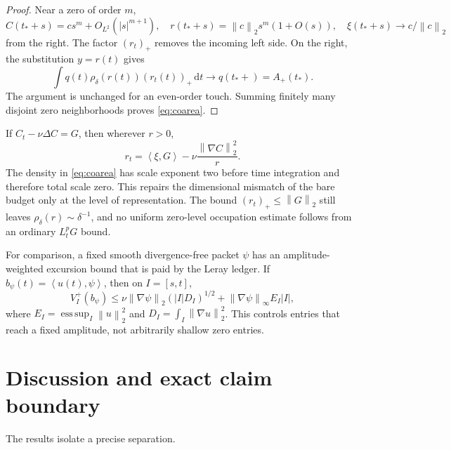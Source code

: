 \documentclass[11pt]{article}
\theoremstyle{definition}
\newcommand{\esssup}{\operatorname*{ess\,sup}}
\newcommand{\ip}[2]{\left\langle #1,#2\right\rangle}
\newcommand{\norm}[1]{\left\lVert #1\right\rVert}
\newcommand{\abs}[1]{\left\lvert #1\right\rvert}
\newcommand{\pos}[1]{\left(#1\right)_{+}}
\newcommand{\dd}{\,\mathrm d}
\begin{document}
\begin{proof}
Near a zero of order \(m\),
\[
 C(t_*+s)=cs^m+O_{L^2}(\abs{s}^{m+1}),
 \quad
 r(t_*+s)=\norm{c}_2s^m(1+O(s)),
 \quad
 \xi(t_*+s)\longrightarrow c/\norm{c}_2
\]
from the right.  The factor \(\pos{r_t}\) removes the incoming left side.
On the right, the substitution \(y=r(t)\) gives
\[
 \int q(t)\rho_\delta(r(t))\pos{r_t(t)}\dd t
 \longrightarrow q(t_*+)=A_+(t_*).
\]
The argument is unchanged for an even-order touch.  Summing finitely many
disjoint zero neighborhoods proves \eqref{eq:coarea}.
\end{proof}

If \(C_t-\nu\Delta C=G\), then wherever \(r>0\),
\begin{equation}\label{eq:radial}
 r_t=\ip{\xi}{G}-\nu\frac{\norm{\nabla C}_2^2}{r}.
\end{equation}
The density in \eqref{eq:coarea} has scale exponent two before time
integration and therefore total scale zero.  This repairs the dimensional
mismatch of the bare budget only at the level of representation.  The bound
\(\pos{r_t}\le\norm{G}_2\) still leaves
\(\rho_\delta(r)\sim\delta^{-1}\), and no uniform zero-level occupation
estimate follows from an ordinary \(L_t^pG\) bound.

For comparison, a fixed smooth divergence-free packet
\(\psi\) has an amplitude-weighted excursion bound that is paid by the
Leray ledger.  If \(b_\psi(t)=\ip{u(t)}{\psi}\), then on
\(I=[s,t]\),
\begin{equation}\label{eq:excursion}
 V_I^+(b_\psi)
 \le\nu\norm{\nabla\psi}_2(\abs I D_I)^{1/2}
 +\norm{\nabla\psi}_\infty E_I\abs I,
\end{equation}
where
\(E_I=\esssup_I\norm{u}_2^2\) and
\(D_I=\int_I\norm{\nabla u}_2^2\).  This controls entries that reach a
fixed amplitude, not arbitrarily shallow zero entries.

\section{Discussion and exact claim boundary}\label{sec:discussion}

The results isolate a precise separation.
\end{document}
